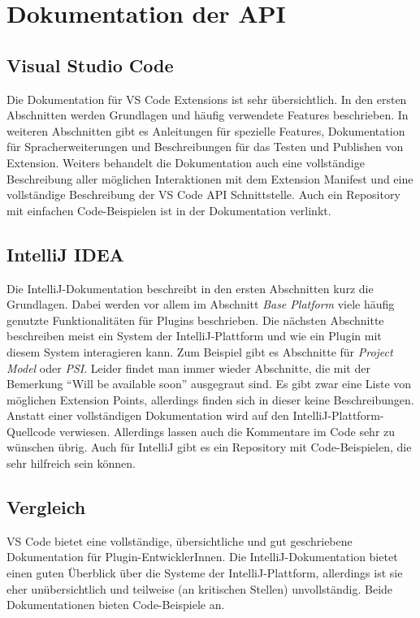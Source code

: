 \section{Dokumentation der API}
\label{sec:Vergleich_Dokumentation}

\subsection{Visual Studio Code}

Die Dokumentation für VS Code Extensions ist sehr übersichtlich.
In den ersten Abschnitten werden Grundlagen und häufig 
verwendete Features beschrieben.
In weiteren Abschnitten gibt es Anleitungen für spezielle Features,
Dokumentation für Spracherweiterungen und Beschreibungen
für das Testen und Publishen von Extension.
Weiters behandelt die Dokumentation auch eine vollständige Beschreibung
aller möglichen Interaktionen mit dem Extension Manifest
und eine vollständige Beschreibung der VS Code API Schnittstelle.
Auch ein Repository mit einfachen Code-Beispielen ist in der Dokumentation verlinkt.

\subsection{IntelliJ IDEA}

Die IntelliJ-Dokumentation beschreibt in den ersten Abschnitten kurz
die Grundlagen. Dabei werden vor allem im
Abschnitt \emph{Base Platform} viele häufig genutzte Funktionalitäten
für Plugins beschrieben. Die nächsten Abschnitte beschreiben
meist ein System der IntelliJ-Plattform und wie ein Plugin mit diesem
System interagieren kann. Zum Beispiel gibt es Abschnitte für \emph{Project Model}
oder \emph{PSI}. Leider findet man immer wieder Abschnitte, die mit der 
Bemerkung \enquote{Will be available soon} ausgegraut sind.
Es gibt zwar eine Liste von möglichen Extension Points, allerdings
finden sich in dieser keine Beschreibungen. Anstatt einer vollständigen
Dokumentation wird auf den IntelliJ-Plattform-Quellcode verwiesen.
Allerdings lassen auch die Kommentare im Code sehr zu wünschen übrig.
Auch für IntelliJ gibt es ein Repository mit Code-Beispielen, die sehr
hilfreich sein können.

\subsection{Vergleich}

VS Code bietet eine vollständige, übersichtliche und gut geschriebene 
Dokumentation für Plugin-EntwicklerInnen. Die IntelliJ-Dokumentation
bietet einen guten Überblick über die Systeme der IntelliJ-Plattform,
allerdings ist sie eher unübersichtlich und teilweise 
(an kritischen Stellen) unvollständig.
Beide Dokumentationen bieten Code-Beispiele an.


